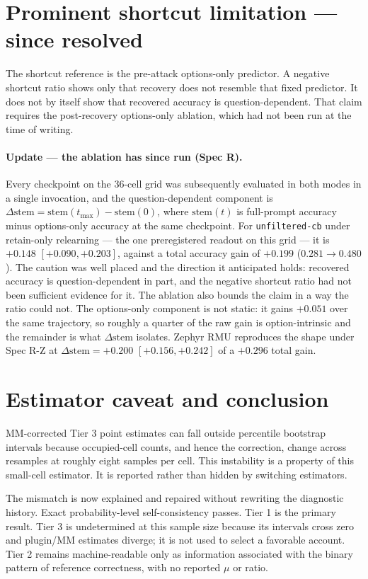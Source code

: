 \documentclass[11pt]{article}
\begin{document}
\section{Prominent shortcut limitation --- since resolved}
The shortcut reference is the pre-attack options-only predictor. A negative
shortcut ratio shows only that recovery does not resemble that fixed
predictor. It does not by itself show that recovered accuracy is
question-dependent. That claim requires the post-recovery options-only
ablation, which had not been run at the time of writing.

\paragraph{Update --- the ablation has since run (Spec R).} Every checkpoint
on the 36-cell grid was subsequently evaluated in both modes in a single
invocation, and the question-dependent component is
$\Delta\mathrm{stem} = \mathrm{stem}(t_{\max}) - \mathrm{stem}(0)$, where
$\mathrm{stem}(t)$ is full-prompt accuracy minus options-only accuracy at the
same checkpoint. For \texttt{unfiltered-cb} under retain-only relearning ---
the one preregistered readout on this grid --- it is
$+0.148$ $[+0.090, +0.203]$, against a total accuracy gain of $+0.199$
($0.281 \to 0.480$). The caution was well placed and the direction it
anticipated holds: recovered accuracy is question-dependent in part, and the
negative shortcut ratio had not been sufficient evidence for it. The ablation
also bounds the claim in a way the ratio could not. The options-only component
is not static: it gains $+0.051$ over the same trajectory, so roughly a quarter
of the raw gain is option-intrinsic and the remainder is what
$\Delta\mathrm{stem}$ isolates. Zephyr RMU reproduces the shape under Spec R-Z
at $\Delta\mathrm{stem} = +0.200$ $[+0.156, +0.242]$ of a $+0.296$ total gain.

\section{Estimator caveat and conclusion}
MM-corrected Tier 3 point estimates can fall outside percentile bootstrap
intervals because occupied-cell counts, and hence the correction, change
across resamples at roughly eight samples per cell.  This instability is a
property of this small-cell estimator.  It is reported rather than hidden by
switching estimators.

The mismatch is now explained and repaired without rewriting the diagnostic
history. Exact probability-level self-consistency passes. Tier 1 is the primary result. Tier 3 is undetermined at this sample size because its intervals cross zero and plugin/MM estimates diverge; it is not used to select a favorable account. Tier 2 remains machine-readable
only as information associated with the binary pattern of reference
correctness, with no reported $\mu$ or ratio.
\end{document}
